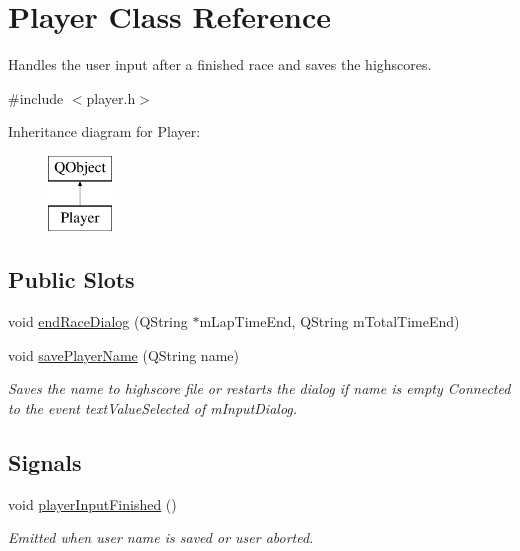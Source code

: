 \hypertarget{class_player}{}\section{Player Class Reference}
\label{class_player}


Handles the user input after a finished race and saves the highscores.  




{\ttfamily \#include $<$player.\+h$>$}

Inheritance diagram for Player\+:\begin{figure}[H]
\begin{center}
\leavevmode
\includegraphics[height=2.000000cm]{class_player}
\end{center}
\end{figure}
\subsection*{Public Slots}
\begin{DoxyCompactItemize}
\item 
void \mbox{\hyperlink{class_player_afcd2ddce4619ffac88b5a4040c5b7833}{end\+Race\+Dialog}} (Q\+String $\ast$m\+Lap\+Time\+End, Q\+String m\+Total\+Time\+End)
\item 
void \mbox{\hyperlink{class_player_a6a28fb76afd94ade6b42289b0496ceeb}{save\+Player\+Name}} (Q\+String name)
\begin{DoxyCompactList}\small\item\em Saves the name to highscore file or restarts the dialog if name is empty Connected to the event text\+Value\+Selected of m\+Input\+Dialog. \end{DoxyCompactList}\end{DoxyCompactItemize}
\subsection*{Signals}
\begin{DoxyCompactItemize}
\item 
void \mbox{\hyperlink{class_player_a0a126c5c399f9a8292f9076912b64ebe}{player\+Input\+Finished}} ()
\begin{DoxyCompactList}\small\item\em Emitted when user name is saved or user aborted. \end{DoxyCompactList}\end{DoxyCompactItemize}

